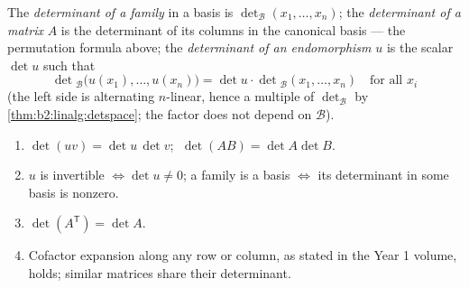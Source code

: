 \begin{definition}[Determinants]\label{def:b2:linalg:det}
The \emph{determinant of a family} in a basis is
$\det_{\mathcal{B}}(x_1, \dots, x_n)$; the \emph{determinant of a
matrix} $A$ is the determinant of its columns in the canonical basis
--- the permutation formula above; the \emph{determinant of an
endomorphism} $u$ is the scalar $\det u$ such that
\[
\det{}_{\mathcal{B}}\bigl(u(x_1), \dots, u(x_n)\bigr)
= \det u \cdot \det{}_{\mathcal{B}}(x_1, \dots, x_n)
\quad \text{for all } x_i
\]
(the left side is alternating $n$-linear, hence a multiple of
$\det_\mathcal{B}$ by \cref{thm:b2:linalg:detspace}; the factor does
not depend on $\mathcal{B}$).
\end{definition}

\begin{theorem}\label{thm:b2:linalg:detrules}
\begin{enumerate}
  \item $\det(uv) = \det u\,\det v$; $\;\det(AB) = \det A \det B$.
  \item $u$ is invertible $\iff \det u \neq 0$; a family is a basis
        $\iff$ its determinant in some basis is nonzero.
  \item $\det(A^{\mathsf T}) = \det A$.
  \item Cofactor expansion along any row or column, as stated in the
        Year 1 volume, holds; similar matrices share their
        determinant.
\end{enumerate}
\end{theorem}

